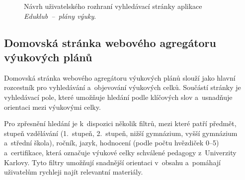 \documentclass[male,czech,api_bc]{kitheses}
\begin{document}
\begin{figure}[H]
	\centering
	\caption{Návrh uživatelského rozhraní vyhledávací stránky aplikace \textit{Eduklub~--~plány výuky}.}
	\label{fig:eduklub-navrh-2}
\end{figure}

\subsection{Domovská stránka webového agregátoru výukových plánů}

Domovská stránka webového agregátoru výukových plánů slouží jako hlavní rozcestník pro vyhledávání a~objevování výukových celků. Součástí stránky je vyhledávací pole, které umožňuje hledání podle klíčových slov a~usnadňuje orientaci mezi výukovými celky.

Pro zpřesnění hledání je k~dispozici několik filtrů, mezi které patří předmět, stupeň vzdělávání (1.~stupeň, 2.~stupeň, nižší gymnázium, vyšší gymnázium a~střední škola), ročník, jazyk, hodnocení (podle počtu hvězdiček 0--5) a~certifikace, která označuje výukové celky schválené pedagogy z~Univerzity Karlovy. Tyto filtry umožňují snadnější orientaci v~obsahu a~pomáhají uživatelům rychleji najít relevantní materiály.

\newpage
\end{document}
